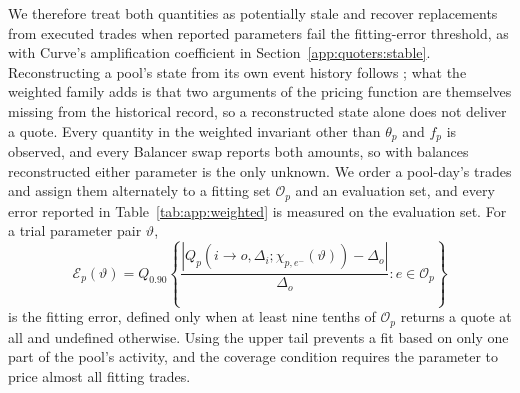 We therefore treat both quantities as potentially stale and recover replacements from executed trades when reported parameters fail the fitting-error threshold, as with Curve's amplification coefficient in Section~\ref{app:quoters:stable}. Reconstructing a pool's state from its own event history follows \citet{LeharParlour2024Uniswap}; what the weighted family adds is that two arguments of the pricing function are themselves missing from the historical record, so a reconstructed state alone does not deliver a quote. Every quantity in the weighted invariant other than $\theta_p$ and $f_p$ is observed, and every Balancer swap reports both amounts, so with balances reconstructed either parameter is the only unknown. We order a pool-day's trades and assign them alternately to a fitting set $\mathcal{O}_p$ and an evaluation set, and every error reported in Table~\ref{tab:app:weighted} is measured on the evaluation set. For a trial parameter pair $\vartheta$,
\[
\mathcal{E}_p(\vartheta)=Q_{0.90}\!\left\{
\frac{|Q_p(i\to o,\Delta_i;\chi_{p,e^-}(\vartheta))-\Delta_o|}{\Delta_o}
: e\in\mathcal{O}_p\right\}
\]
is the fitting error, defined only when at least nine tenths of $\mathcal{O}_p$ returns a quote at all and undefined otherwise. Using the upper tail prevents a fit based on only one part of the pool's activity, and the coverage condition requires the parameter to price almost all fitting trades.

